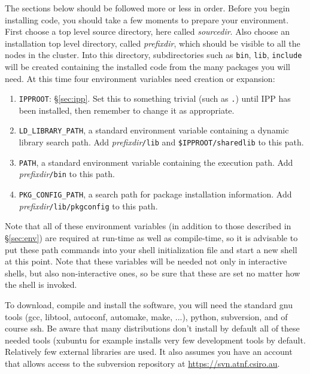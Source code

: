 The sections below should be followed more or less in order.
Before you begin installing code, you should take a few moments to prepare your environment.
First choose a top level source directory, here called {\em sourcedir}.
Also choose an installation top level directory, called {\em prefixdir}, which should be visible to all the nodes in the cluster.  
Into this directory, subdirectories such as {\tt bin}, {\tt lib}, {\tt include} will be created containing the installed code from the many packages you will need.
At this time four environment variables need creation or expansion:
\begin{enumerate}
\item {\tt IPPROOT}: \S\ref{sec:ipp}.
Set this to something trivial (such as {\tt .}) until IPP has been installed, then remember to change it as appropriate.
\item {\tt LD\_LIBRARY\_PATH}, a standard environment variable containing a dynamic library search path.  
Add {\em prefixdir}{\tt /lib} and {\tt \$IPPROOT/sharedlib} to this path.
\item {\tt PATH}, a standard environment variable containing the execution path.
Add {\em prefixdir}{\tt /bin} to this path.
\item {\tt PKG\_CONFIG\_PATH}, a search path for package installation information.
Add {\em prefixdir}{\tt /lib/pkgconfig} to this path.
\end{enumerate}

Note that all of these environment variables (in addition to those described in \S\ref{sec:env}) are required at run-time as well as compile-time, so it is advisable to put these path commands into your shell initialization file and start a new shell at this point.
Note that these variables will be needed not only in interactive shells, but also non-interactive ones, so be sure that these are set no matter how the shell is invoked.

To download, compile and install the software, you will need the standard gnu tools (gcc, libtool, autoconf, automake, make, ...), python, subversion, and of course ssh.
Be aware that many distributions don't install by default all of these needed tools (xubuntu for example installs very few development tools by default.
Relatively few external libraries are used.
It also assumes you have an account that allows access to the subversion repository at \url{https://svn.atnf.csiro.au}.


